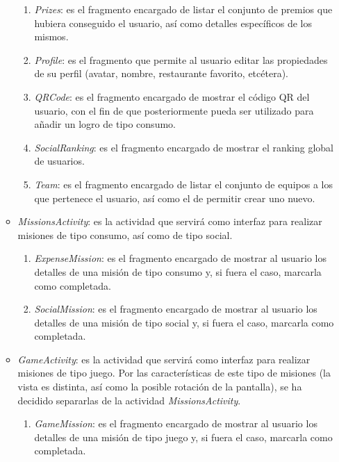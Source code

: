 \documentclass[twoside]{report}
\begin{document}
\begin{enumerate}
\begin{itemize}
\begin{enumerate}
			\item \textit{Prizes}: es el fragmento encargado de listar el conjunto de premios que hubiera conseguido el usuario, así como detalles específicos de los mismos.
			
			\item \textit{Profile}: es el fragmento que permite al usuario editar las propiedades de su perfil (avatar, nombre, restaurante favorito, etcétera).
			
			\item \textit{QRCode}: es el fragmento encargado de mostrar el código QR del usuario, con el fin de que posteriormente pueda ser utilizado para añadir un logro de tipo consumo.
			
			\item \textit{SocialRanking}: es el fragmento encargado de mostrar el ranking global de usuarios.
			
			\item \textit{Team}: es el fragmento encargado de listar el conjunto de equipos a los que pertenece el usuario, así como el de permitir crear uno nuevo.
		\end{enumerate}
		
	\item \textit{MissionsActivity}: es la actividad que servirá como interfaz para realizar misiones de tipo consumo, así como de tipo social. 
	
		\begin{enumerate}
		\item \textit{ExpenseMission}: es el fragmento encargado de mostrar al usuario los detalles de una misión de tipo consumo y, si fuera el caso, marcarla como completada.
		
		\item \textit{SocialMission}: es el fragmento encargado de mostrar al usuario los detalles de una misión de tipo social y, si fuera el caso, marcarla como completada.
		\end{enumerate}
		
	\item \textit{GameActivity}: es la actividad que servirá como interfaz para realizar misiones de tipo juego. Por las características de este tipo de misiones (la vista es distinta, así como la posible rotación de la pantalla), se ha decidido separarlas de la actividad \textit{MissionsActivity}.
	\begin{enumerate}
		\item \textit{GameMission}: es el fragmento encargado de mostrar al usuario los detalles de una misión de tipo juego y, si fuera el caso, marcarla como completada.
		\end{enumerate}
		

\end{itemize}
\end{enumerate}
\end{document}
